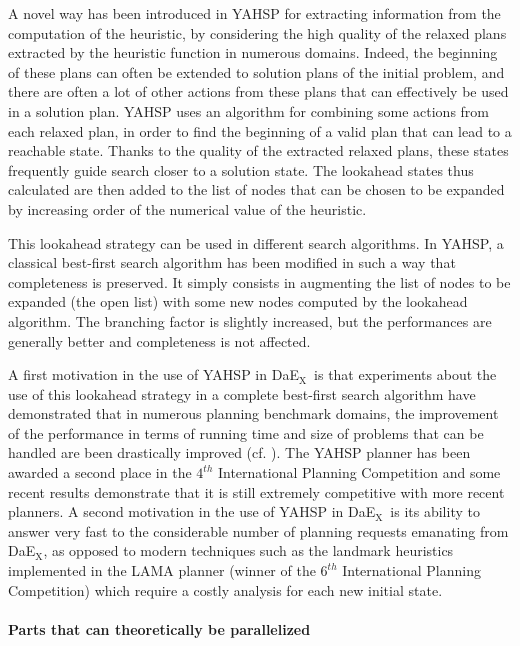 \documentclass{sig-alternate}
\newcommand{\DAEX}{{\sc DaE$_{\text{X}}$}}
\begin{document}
A novel  way has been  introduced in YAHSP  for extracting information  from the
computation of  the heuristic,  by considering the  high quality of  the relaxed
plans  extracted by  the heuristic  function in  numerous domains.   Indeed, the
beginning of these plans can often  be extended to solution plans of the initial
problem, and there  are often a lot  of other actions from these  plans that can
effectively be  used in a solution  plan. YAHSP uses an  algorithm for combining
some actions from each  relaxed plan, in order to find the  beginning of a valid
plan that can lead to a reachable  state. Thanks to the quality of the extracted
relaxed  plans,  these states  frequently  guide  search  closer to  a  solution
state. The lookahead states thus calculated  are then added to the list of nodes
that can be chosen to be expanded  by increasing order of the numerical value of
the  heuristic.

This lookahead  strategy can be used  in different search  algorithms. In YAHSP,
a classical  best-first search algorithm  has been modified  in such a  way that
completeness is preserved.   It simply consists in augmenting  the list of nodes
to be  expanded (the open  list) with some  new nodes computed by  the lookahead
algorithm.  The branching factor is slightly increased, but the performances are
generally better and completeness is not affected.

A first motivation in  the use of YAHSP in \DAEX\ is  that experiments about the
use of  this lookahead strategy in  a complete best-first  search algorithm have
demonstrated that in numerous planning benchmark domains, the improvement of the
performance in  terms of running time and  size of problems that  can be handled
are been  drastically improved (cf. \cite{yahsp:icaps2004}).   The YAHSP planner
has been  awarded a second place  in the $4^{th}$  International Planning Competition
\cite{ipc4:jair05} and some  recent results \cite{rintanen:acai2010} demonstrate
that  it is still  extremely competitive  with more  recent planners.   A second
motivation in the use  of YAHSP in \DAEX\ is its ability  to answer very fast to
the considerable number of planning requests emanating from \DAEX, as opposed to
modern  techniques such  as  the  landmark heuristics  implemented  in the  LAMA
planner   \cite{lama:jair2010}  (winner  of   the  $6^{th}$   International  Planning
Competition) which require a costly analysis for each new initial state.

\paragraph{Parts that can theoretically be parallelized} %
\end{document}
